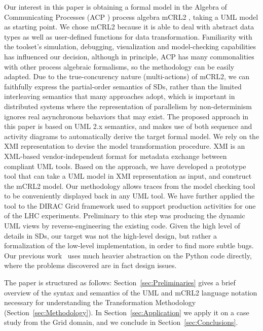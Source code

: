 \documentclass[letter]{llncs}
\begin{document}
Our interest in this paper is obtaining a formal model in the Algebra of
Communicating Processes (ACP \cite{process_algebra}) process algebra mCRL2
\cite{FormalLanguagemCRL2},
taking a UML model as starting point. We chose mCRL2 because it is able to deal
with abstract
data types as well as user-defined functions for data transformation.
Familiarity with the toolset's simulation,
debugging,
visualization and model-checking capabilities has
influenced our decision, although in principle, ACP has many commonalities with
other process algebraic formalisms,
so the methodology can be easily adapted.
Due to the true-concurency nature (multi-actions) of mCRL2, we can faithfully express the
partial-order semantics of SDs, rather than the limited interleaving semantics that many approaches 
adopt, which is important in distributed systems where the representation of parallelism by non-determinism
ignores real asynchronous behaviors that may exist.
The proposed approach in this paper is based on UML 2.x semantics, and makes use
of both sequence and activity diagrams to automatically derive the target formal model.
We rely on the XMI representation
to devise the model transformation procedure. XMI \cite{UML2.4} is an XML-based vendor-independent format for metadata exchange between
compliant UML tools.
Based on the approach, we have
developed 
a prototype tool that can take a UML model in XMI representation as input, and
construct
the mCRL2 model. Our methodology allows traces from the model
checking tool 
to be conveniently displayed back in any UML tool. 
We have further applied the tool to the DIRAC \cite{DIRAC_CommGridSolution} Grid
framework used to support production activities
for one of the LHC experiments. Preliminary to this step was producing 
the dynamic UML views by reverse-engineering the existing code. Given the high level of 
details in SDs, our target was not the high-level design, but 
rather a formalization of the low-level implementation, in order to find more subtle bugs.
Our previous work~\cite{remenska:using} uses
much heavier abstraction on the Python code directly, where the problems
discovered are in fact design issues. 

The paper is structured as follows: Section~\ref{sec:Preliminaries} gives a brief overview of the 
syntax and semantics of the UML and mCRL2 language notation necessary for understanding the Transformation Methodology (Section~\ref{sec:Methodology}).
In Section~\ref{sec:Application} we apply it on a case study from the Grid domain, and we conclude in Section~\ref{sec:Conclusions}.
\end{document}
